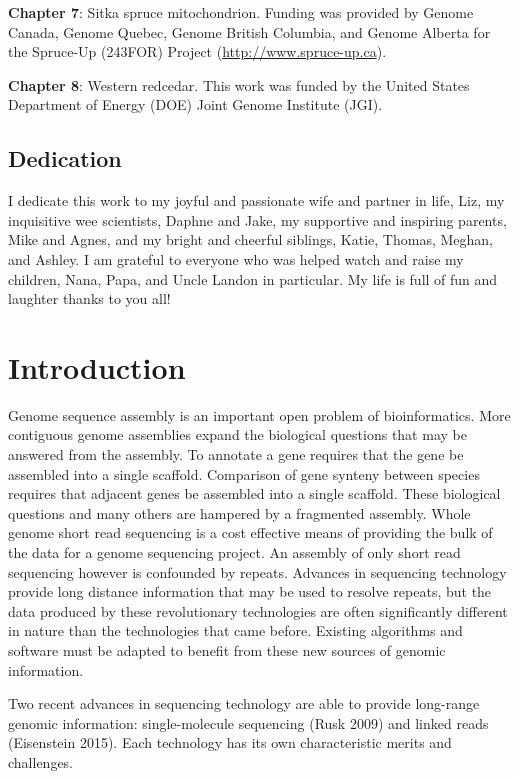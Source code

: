 \documentclass[
  12pt,
  oneside,
  openany]{book}
\begin{document}
\textbf{Chapter 7}: Sitka spruce mitochondrion. Funding was provided by Genome Canada, Genome Quebec, Genome British Columbia, and Genome Alberta for the Spruce-Up (243FOR) Project (\url{http://www.spruce-up.ca}).

\textbf{Chapter 8}: Western redcedar. This work was funded by the United States Department of Energy (DOE) Joint Genome Institute (JGI).

\newpage

\hypertarget{dedication}{%
\section{Dedication}\label{dedication}}

I dedicate this work to my joyful and passionate wife and partner in life, Liz, my inquisitive wee scientists, Daphne and Jake, my supportive and inspiring parents, Mike and Agnes, and my bright and cheerful siblings, Katie, Thomas, Meghan, and Ashley. I am grateful to everyone who was helped watch and raise my children, Nana, Papa, and Uncle Landon in particular. My life is full of fun and laughter thanks to you all!

\mainmatter

\hypertarget{introduction}{%
\chapter{Introduction}\label{introduction}}

Genome sequence assembly is an important open problem of bioinformatics. More contiguous genome assemblies expand the biological questions that may be answered from the assembly. To annotate a gene requires that the gene be assembled into a single scaffold. Comparison of gene synteny between species requires that adjacent genes be assembled into a single scaffold. These biological questions and many others are hampered by a fragmented assembly. Whole genome short read sequencing is a cost effective means of providing the bulk of the data for a genome sequencing project. An assembly of only short read sequencing however is confounded by repeats. Advances in sequencing technology provide long distance information that may be used to resolve repeats, but the data produced by these revolutionary technologies are often significantly different in nature than the technologies that came before. Existing algorithms and software must be adapted to benefit from these new sources of genomic information.

Two recent advances in sequencing technology are able to provide long-range genomic information: single-molecule sequencing (Rusk 2009) and linked reads (Eisenstein 2015). Each technology has its own characteristic merits and challenges.
\end{document}
